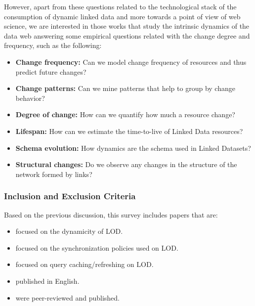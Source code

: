 \documentclass[sw]{iosart2x}
\begin{document}

However, apart from these questions related to the technological stack of the consumption of dynamic linked data and more towards a point of view of web science, we are interested in those works that study the intrinsic dynamics of the data web answering some empirical questions related with the change degree and frequency, such as the following:

\begin{itemize}

\item \textbf{Change frequency:} Can we model change frequency of resources and thus predict future changes?

\item \textbf{Change patterns:} Can we mine patterns that help to group by change behavior?

\item \textbf{Degree of change:} How can we quantify how much a resource change?

\item \textbf{Lifespan:} How can we estimate the time-to-live of Linked Data resources?

\item \textbf{Schema evolution:} How dynamics are the schema used in Linked Datasets?

\item \textbf{Structural changes:} Do we observe any changes in the structure of the network formed by links?

\end{itemize}

\subsubsection{Inclusion and Exclusion Criteria}\label{Criteria}

Based on the previous discussion, this survey includes papers that are:

\begin{itemize}

\item focused on the dynamicity of LOD.

\item focused on the synchronization policies used on LOD.

\item focused on query caching/refreshing on LOD.

\item published in English.

\item were peer-reviewed and published.

\end{itemize}
\end{document}
